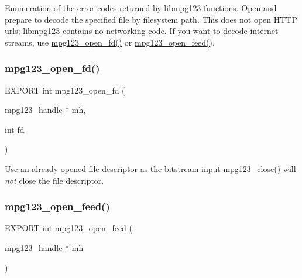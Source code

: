 Enumeration of the error codes returned by libmpg123 functions. Open and prepare to decode the specified file by filesystem path. This does not open H\+T\+TP urls; libmpg123 contains no networking code. If you want to decode internet streams, use \hyperlink{group__mpg123__input_gaf205cf0e2c2a6612f564b17d50d227f4}{mpg123\+\_\+open\+\_\+fd()} or \hyperlink{group__mpg123__input_gafa7b573253221fa87df7087110529cce}{mpg123\+\_\+open\+\_\+feed()}. \mbox{\label{group__mpg123__input_gaf205cf0e2c2a6612f564b17d50d227f4}} 
\subsubsection{\texorpdfstring{mpg123\+\_\+open\+\_\+fd()}{mpg123\_open\_fd()}}
{\footnotesize\ttfamily E\+X\+P\+O\+RT int mpg123\+\_\+open\+\_\+fd (\begin{DoxyParamCaption}\item[{\hyperlink{group__mpg123__init_ga6728e2839a395f3a07d4514da659faca}{mpg123\+\_\+handle} $\ast$}]{mh,  }\item[{int}]{fd }\end{DoxyParamCaption})}

Use an already opened file descriptor as the bitstream input \hyperlink{group__mpg123__input_ga1c86c6042807ab7734b67a829ee7a2e7}{mpg123\+\_\+close()} will {\itshape not} close the file descriptor. \mbox{\label{group__mpg123__input_gafa7b573253221fa87df7087110529cce}} 
\subsubsection{\texorpdfstring{mpg123\+\_\+open\+\_\+feed()}{mpg123\_open\_feed()}}
{\footnotesize\ttfamily E\+X\+P\+O\+RT int mpg123\+\_\+open\+\_\+feed (\begin{DoxyParamCaption}\item[{\hyperlink{group__mpg123__init_ga6728e2839a395f3a07d4514da659faca}{mpg123\+\_\+handle} $\ast$}]{mh }\end{DoxyParamCaption})}

